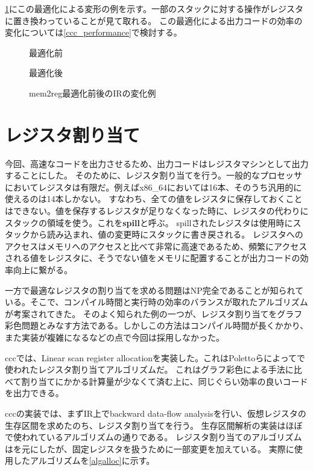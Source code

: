\documentclass[uplatex,a4paper]{jsarticle}
\begin{document}
\cref{ccc_mem2reg_fig}にこの最適化による変形の例を示す。一部のスタックに対する操作がレジスタに置き換わっていることが見て取れる。
この最適化による出力コードの効率の変化については\cref{ccc_performance}で検討する。

\begin{figure}[h]
  \begin{minipage}{0.50\hsize}
    \centering
    
    \caption*{最適化前}
  \end{minipage}
  \begin{minipage}{0.50\hsize}
    \centering
    
    \caption*{最適化後}
  \end{minipage}
  \caption{mem2reg最適化前後のIRの変化例}
  \label{ccc_mem2reg_fig}
\end{figure}

\clearpage
\section{レジスタ割り当て}
\label{ccc_regalloc}

今回、高速なコードを出力させるため、出力コードはレジスタマシンとして出力することにした。
そのために、レジスタ割り当てを行う。一般的なプロセッサにおいてレジスタは有限だ。例えばx86\_64においては16本、そのうち汎用的に使えるのは14本しかない。
すなわち、全ての値をレジスタに保存しておくことはできない。値を保存するレジスタが足りなくなった時に、レジスタの代わりにスタックの領域を使う。これを\textbf{spill}と呼ぶ。
spillされたレジスタは使用時にスタックから読み込まれ、値の変更時にスタックに書き戻される。
レジスタへのアクセスはメモリへのアクセスと比べて非常に高速であるため、頻繁にアクセスされる値をレジスタに、そうでない値をメモリに配置することが出力コードの効率向上に繋がる。

一方で最適なレジスタの割り当てを求める問題はNP完全であることが知られている。そこで、コンパイル時間と実行時の効率のバランスが取れたアルゴリズムが考案されてきた。
そのよく知られた例の一つが、レジスタ割り当てをグラフ彩色問題とみなす方法\cite{chaitin1981register}である。しかしこの方法はコンパイル時間が長くかかり、また実装が複雑になるなどの点で今回は採用しなかった。

cccでは、Linear scan register allocationを実装した。これはPolettoらによって\cite{poletto1997tcc}で使われたレジスタ割り当てアルゴリズムだ。
これはグラフ彩色による手法に比べて割り当てにかかる計算量が少なくて済む上に、同じぐらい効率の良いコードを出力できる。

cccの実装では、まずIR上でbackward data-flow analysis\cite{av2009コンパイラ}を行い、仮想レジスタの生存区間を求めたのち、レジスタ割り当てを行う。
生存区間解析の実装はほぼ\cite{wimmer2004linear}で使われているアルゴリズムの通りである。
レジスタ割り当てのアルゴリズムは\cite{poletto1999linear}を元にしたが、固定レジスタを扱うために一部変更を加えている。
実際に使用したアルゴリズムを\cref{algalloc}に示す。
\end{document}
